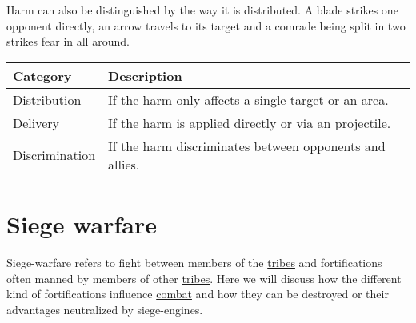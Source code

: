 Harm can also be distinguished by the way it is distributed. A blade strikes
one opponent directly, an arrow travels to its target and a comrade being split
in two strikes fear in all around.

\begin{longtable}{ll}
	\toprule
	Category       & Description                                             \\
	\midrule
	Distribution   & If the harm only affects a single target or an area.    \\
	Delivery       & If the harm is applied directly or via an projectile.   \\
	Discrimination & If the harm discriminates between opponents and allies. \\
	\bottomrule
\end{longtable}

\section{Siege warfare}\label{ch:Conflict:Sieges}

Siege-warfare refers to fight between members of the
\hyperref[ch:Tribes]{tribes} and fortifications often manned by members of
other \hyperref[ch:Tribes]{tribes}. Here we will discuss how the different kind
of fortifications influence \hyperref[ch:Conflict:Combat]{combat} and how they
can be destroyed or their advantages neutralized by siege-engines.

